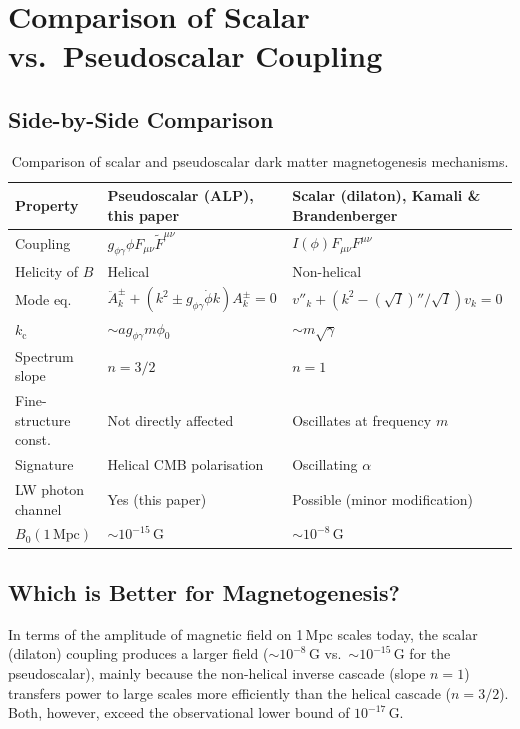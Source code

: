 \documentclass[12pt,a4paper]{report}
\newcommand{\kc}{k_{\mathrm{c}}}
\newcommand{\gag}{g_{\phi\gamma}}
\newcommand{\phizero}{\phi_0}
\theoremstyle{definition}
\begin{document}
\chapter{Comparison of Scalar vs.\ Pseudoscalar Coupling}

\section{Side-by-Side Comparison}

\begin{table}[h]
\centering
\renewcommand{\arraystretch}{1.4}
\begin{tabular}{lll}
\toprule
Property & Pseudoscalar (ALP), this paper & Scalar (dilaton), Kamali \& Brandenberger \\
\midrule
Coupling & $\gag\phi F_{\mu\nu}\tilde F^{\mu\nu}$ & $I(\phi)F_{\mu\nu}F^{\mu\nu}$ \\
Helicity of $B$ & Helical & Non-helical \\
Mode eq.\ & $\ddot A_k^\pm + (k^2\pm\gag\dot\phi k)A_k^\pm=0$ & $v''_k+(k^2-(\sqrt I)''/\sqrt I)v_k=0$ \\
$\kc$ & $\sim a\gag m\phizero$ & $\sim m\sqrt\gamma$ \\
Spectrum slope & $n=3/2$ & $n=1$ \\
Fine-structure const.\ & Not directly affected & Oscillates at frequency $m$ \\
Signature & Helical CMB polarisation & Oscillating $\alpha$ \\
LW photon channel & Yes (this paper) & Possible (minor modification) \\
$B_0(1\,\mathrm{Mpc})$ & $\sim 10^{-15}$\,G & $\sim 10^{-8}$\,G \\
\bottomrule
\end{tabular}
\caption{Comparison of scalar and pseudoscalar dark matter magnetogenesis mechanisms.}
\label{tab:comparison}
\end{table}

\section{Which is Better for Magnetogenesis?}

In terms of the amplitude of magnetic field on 1\,Mpc scales today, the scalar
(dilaton) coupling produces a larger field ($\sim 10^{-8}$\,G vs.\ $\sim 10^{-15}$\,G
for the pseudoscalar), mainly because the non-helical inverse cascade (slope $n=1$)
transfers power to large scales more efficiently than the helical cascade ($n=3/2$).
Both, however, exceed the observational lower bound of $10^{-17}$\,G.
\end{document}
